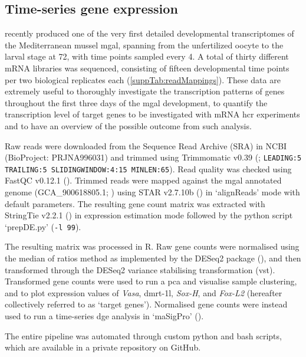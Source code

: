 \subsection{Time-series gene expression}
 recently produced one of the very first detailed developmental transcriptomes of the Mediterranean mussel \gls{mgal}, spanning from the unfertilized oocyte to the larval stage at \qty{72}{\hpf}, with time points sampled every \qty{4}{\hpf}. A total of thirty different mRNA libraries was sequenced, consisting of fifteen developmental time points per two biological replicates each (\cref{suppTab:readMappings}). These data are extremely useful to thoroughly investigate the transcription patterns of genes throughout the first three days of the \gls{mgal} development, to quantify the transcription level of target genes to be investigated with mRNA \gls{hcr} experiments and to have an overview of the possible outcome from such analysis.

Raw reads were downloaded from the Sequence Read Archive (SRA) in NCBI (BioProject: PRJNA996031) and trimmed using Trimmomatic v0.39 (; \verb|LEADING:5| \verb|TRAILING:5 SLIDINGWINDOW:4:15 MINLEN:65|). Read quality was checked using FastQC v0.12.1 (). Trimmed reads were mapped against the \gls{mgal} annotated genome (GCA\_900618805.1; ) using STAR v2.7.10b () in ‘alignReads’ mode with default parameters. The resulting gene count matrix was extracted with StringTie v2.2.1 () in expression estimation mode followed by the python script ‘prepDE.py’ (\verb|-l 99|).

The resulting matrix was processed in R. Raw gene counts were normalised using the median of ratios method as implemented by the DESeq2 package (), and then transformed through the DESeq2 variance stabilising transformation (vst). Transformed gene counts were used to run a \gls{pca} and visualise sample clustering, and to plot expression values of \textit{Vasa}, \gls{dmrt-1l}, \textit{Sox-H}, and \textit{Fox-L2} (hereafter collectively referred to as ‘target genes’). Normalised gene counts were instead used to run a time-series \gls{dge} analysis in ‘maSigPro’ ().

The entire pipeline was automated through custom python and bash scripts, which are available in a private repository on GitHub.

